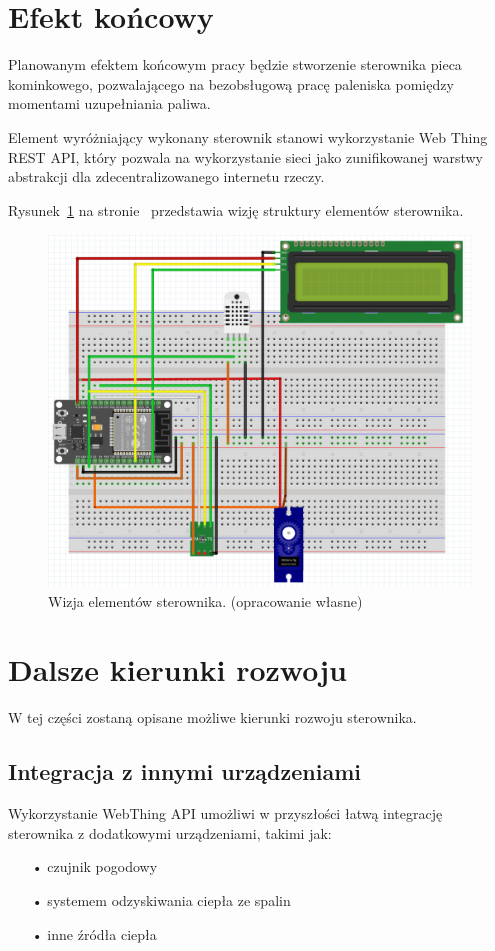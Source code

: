 \documentclass[11pt]{report}
\begin{document}
 \section{Efekt końcowy}
 Planowanym efektem końcowym pracy będzie stworzenie sterownika pieca kominkowego, pozwalającego na bezobsługową pracę paleniska pomiędzy momentami uzupełniania paliwa.

 Element wyróżniający wykonany sterownik stanowi wykorzystanie Web Thing REST API, który pozwala na wykorzystanie sieci jako zunifikowanej warstwy abstrakcji dla zdecentralizowanego internetu rzeczy.
 
 Rysunek~\ref{fig:wizja} na stronie~\pageref{fig:wizja} przedstawia wizję struktury elementów sterownika.
 \begin{figure}[ht]
\centering
\includegraphics[width=0.8 \textwidth]{fig/fritzing_bredboard_v1.png}
\caption{Wizja elementów sterownika. (opracowanie własne)}
\label{fig:wizja}
\end{figure}
 
 \section{Dalsze kierunki rozwoju}
 W tej części zostaną opisane możliwe kierunki rozwoju sterownika.
 \subsection{Integracja z innymi urządzeniami}
 Wykorzystanie WebThing API umożliwi w przyszłości łatwą integrację sterownika z dodatkowymi urządzeniami, takimi jak:
 \begin{enumerate}
 \item[•] czujnik pogodowy
 \item[•] systemem odzyskiwania ciepła ze spalin
 \item[•] inne źródła ciepła
 \end{enumerate}
\end{document}
